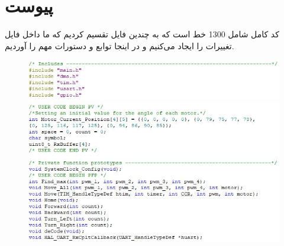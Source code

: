 \chapter*{‌پیوست}
کد کامل شامل 1300 خط است که به چندین فایل تقسیم کردیم که ما داخل فایل  تغییرات را ایجاد می‌کنیم و در اینجا توابع و دستورات مهم را آوردیم.

    \begin{figure}[!h]
	\centering
	\includegraphics[width=\columnwidth]{./Images/Appendix/IMG_1.JPG}
	
	\vspace{0.5cm}
	\includegraphics[width=\columnwidth]{./Images/Appendix/IMG_2.JPG}
	\end{figure}
	
